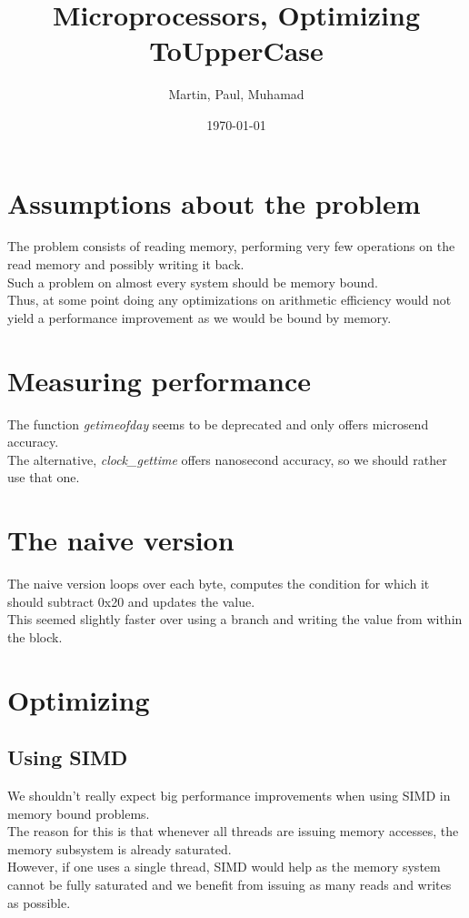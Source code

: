 \documentclass[10pt, fleqn]{article}
\title{Microprocessors, Optimizing ToUpperCase}
\author{Martin, Paul, Muhamad}
\date{\today}
\begin{document}
\maketitle

\section{Assumptions about the problem}
The problem consists of reading memory, performing very few operations on the read memory and possibly writing it back.\\
Such a problem on almost every system should be memory bound.\\
Thus, at some point doing any optimizations on arithmetic efficiency would not yield a performance improvement as we would be bound by memory.\\

\section{Measuring performance}
The function \textit{getimeofday} seems to be deprecated and only offers microsend accuracy.\\
The alternative, \textit{clock\_gettime} offers nanosecond accuracy, so we should rather use that one.

\section{The naive version}
The naive version loops over each byte, computes the condition for which it should subtract 0x20 and updates the value.\\
This seemed slightly faster over using a branch and writing the value from within the block.

\section{Optimizing}

\subsection{Using SIMD}
We shouldn't really expect big performance improvements when using SIMD in memory bound problems.\\
The reason for this is that whenever all threads are issuing memory accesses, the memory subsystem is already saturated.\\
However, if one uses a single thread, SIMD would help as the memory system cannot be fully saturated and we benefit from issuing as many reads and writes as possible.\\
\end{document}
